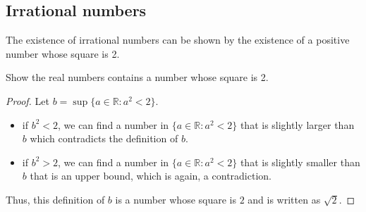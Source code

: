 \subsection{Irrational numbers}
The existence of irrational numbers can be shown by the existence of a positive number whose square is 2. 
\begin{problem}
    Show the real numbers contains a number whose square is 2. 
\end{problem}
\begin{proof}
    Let $b = \sup\{a\in \mathbb{R}: a^2 < 2\}$. 
    \begin{itemize}
        \item if $b^2 < 2$, we can find a number in $\{a\in \mathbb{R}: a^2 < 2\}$ that is slightly larger than $b$ which contradicts the definition of $b$. 
        \item if $b^2 > 2$, we can find a number in $\{a\in \mathbb{R}: a^2 < 2\}$ that is slightly smaller than $b$ that is an upper bound, which is again, a contradiction.
    \end{itemize}
    Thus, this definition of $b$ is a number whose square is $2$ and is written as $\sqrt{2}$.
\end{proof}


